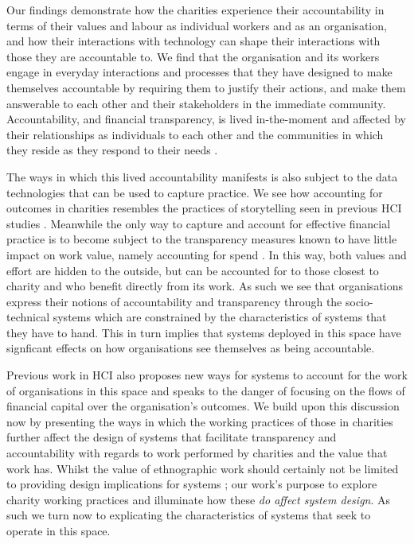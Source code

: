 Our findings demonstrate how the charities experience their accountability in terms of their values and labour as individual workers and as an organisation, and how their interactions with technology can shape their interactions with those they are accountable to. We find that the organisation and its workers engage in everyday interactions and processes that they have designed to make themselves accountable by requiring them to justify their actions, and make them answerable \cite{fox_uncertain_2007} to each other and their stakeholders in the immediate community. Accountability, and financial transparency, is lived in-the-moment and affected by their relationships as individuals to each other and the communities in which they reside as they respond to their needs
\cite{koppell_pathologies_2005}.

The ways in which this lived accountability manifests is also subject to the data technologies that can be used to capture practice. We see how accounting for outcomes in charities resembles the practices of storytelling seen in previous HCI studies \cite{erete_storytelling_2016}. Meanwhile the only way to capture and account for effective financial practice is to become subject to the transparency measures known to have little impact on work value, namely accounting for spend \cite{heald_varieties_2006}. In this way, both values and effort are hidden to the outside, but can be accounted for to those closest to charity and who benefit directly from its work. As such we see that organisations express their notions of accountability and transparency through the socio-technical systems which are constrained by the characteristics of systems that they have to hand. This in turn implies that systems deployed in this space have signficant effects on how organisations see themselves as being accountable.

Previous work in HCI also proposes new ways for systems to account for the work of organisations in this space \cite{marshall_accountable:_2016} and speaks to the danger of focusing on the flows of financial capital over the organisation's outcomes. We build upon this discussion now by presenting the ways in which the working practices of those in charities further affect the design of systems that facilitate transparency and accountability with regards to work performed by charities and the value that work has. Whilst the value of ethnographic work should certainly not be limited to providing design implications for systems \cite{dourish_implications_2006}; our work's purpose to explore charity working practices and illuminate how these \textit{do affect system design}. As such we turn now to explicating the characteristics of systems that seek to operate in this space.


